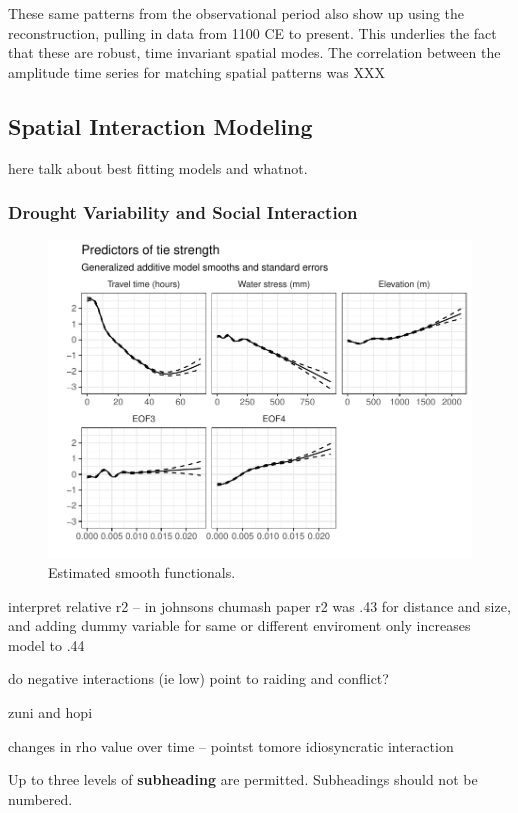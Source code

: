 \documentclass[fleqn,10pt]{wlscirep}
\begin{document}
These same patterns from the observational period also show up using the reconstruction, pulling in data from 1100 CE to present. This underlies the fact that these are robust, time invariant spatial modes. The correlation between the amplitude time series for matching spatial patterns was XXX


\subsection*{Spatial Interaction Modeling}

here talk about best fitting models and whatnot.




\subsubsection*{Drought Variability and Social Interaction}

\begin{figure}[ht]
\centering
\includegraphics[width=.8\linewidth]{figures/smooths.pdf}
\caption{Estimated smooth functionals.}
\label{fig:smooths}
\end{figure}

interpret relative r2 -- in johnsons chumash paper r2 was .43 for distance and size, and adding dummy variable for same or different enviroment only increases model to .44

do negative interactions (ie low) point to raiding and conflict?

zuni and hopi

changes in rho value over time -- pointst tomore idiosyncratic interaction

Up to three levels of \textbf{subheading} are permitted. Subheadings should not be numbered.
\end{document}
